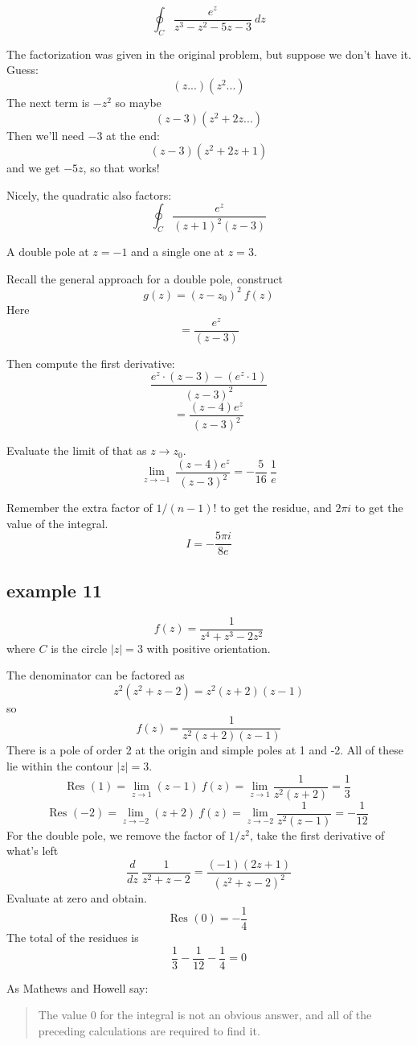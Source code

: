 \documentclass[11pt, oneside]{article}
\begin{document}
\[ \oint_C \frac{e^z}{z^3 - z^2 - 5z - 3} \ dz \]

The factorization was given in the original problem, but suppose we don't have it.  Guess:
\[ (z ...)(z^2 ... ) \]
The next term is $-z^2$ so maybe 
\[ (z -3)(z^2 + 2z ... ) \]
Then we'll need $-3$ at the end:
\[ (z - 3)(z^2 + 2z + 1) \]
and we get $-5z$, so that works!

Nicely, the quadratic also factors:
\[ \oint_C \frac{e^z}{(z+1)^2 (z-3)} \]

A double pole at $z = -1$ and a single one at $z = 3$.

Recall the general approach for a double pole, construct
\[ g(z) = (z - z_0)^2 \ f(z) \]
Here
\[ = \frac{e^z}{(z-3)} \]

Then compute the first derivative:
\[ \frac{e^z \cdot (z-3) - (e^z \cdot 1)}{(z - 3)^2} \]
\[ = \frac{(z-4)e^z}{(z-3)^2} \]

Evaluate the limit of that as $z \rightarrow z_0$.
\[ \lim_{z \rightarrow -1} \ \frac{(z-4)e^z}{(z-3)^2} = -\frac{5}{16} \ \frac{1}{e} \]

Remember the extra factor of $1/(n-1)!$ to get the residue, and $2 \pi i$ to get the value of the integral.
\[ I = -\frac{5 \pi i}{8 e} \]

\subsection*{example  11}

\label{sec:ex11R}

\[ f(z) = \frac{1}{z^4 + z^3 - 2z^2} \]
where $C$ is the circle $|z| = 3$ with positive orientation.

The denominator can be factored as
\[ z^2(z^2 + z - 2) = z^2(z + 2)(z - 1) \]
so
\[ f(z) = \frac{1}{z^2(z + 2)(z - 1)} \]
There is a pole of order 2 at the origin and simple poles at 1 and -2.  All of these lie within the contour $|z| = 3$.
\[ \text{Res }(1) = \lim_{z \rightarrow 1} (z-1) \ f(z) = \lim_{z \rightarrow 1} \frac{1}{z^2 (z + 2)} = \frac{1}{3} \]
\[ \text{Res }(-2) = \lim_{z \rightarrow -2} (z+2) \ f(z) = \lim_{z \rightarrow -2} \frac{1}{z^2 (z - 1)} = -\frac{1}{12} \]
For the double pole, we remove the factor of $1/z^2$, take the first derivative of what's left
\[ \frac{d}{dz} \ \frac{1}{z^2 + z - 2} = \frac{(-1)(2z + 1)}{(z^2 + z - 2)^2} \]
Evaluate at zero and obtain.
\[ \text{Res }(0) = - \frac{1}{4} \]
The total of the residues is
\[ \frac{1}{3} -\frac{1}{12} - \frac{1}{4} = 0 \]

As Mathews and Howell say:
\begin{quote}The value 0 for the integral is not an obvious answer, and all of the preceding calculations are required to find it.\end{quote}
\end{document}
